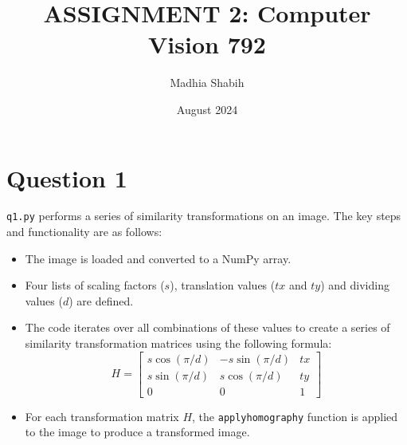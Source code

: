 \documentclass{article}
\title{ASSIGNMENT 2: Computer Vision 792}
\author{Madhia Shabih}
\date{August 2024}
\begin{document}
\maketitle
\section{Question 1}

\texttt{q1.py} performs a series of similarity transformations on an image. The key steps and functionality are as follows:

\begin{itemize}
    \item The image is loaded and converted to a NumPy array.
    \item Four lists of scaling factors ($s$), translation values ($tx$ and $ty$) and dividing values ($d$) are defined.
    \item The code iterates over all combinations of these values to create a series of similarity transformation matrices using the following formula:
    \[
    H = \begin{bmatrix}
    s \cos(\pi/d) & -s \sin(\pi/d) & tx \\
    s \sin(\pi/d) & s \cos(\pi/d) & ty \\
    0 & 0 & 1
    \end{bmatrix}
    \]
    \item For each transformation matrix $H$, the \texttt{applyhomography} function is applied to the image to produce a transformed image.
\end{itemize}
\end{document}
